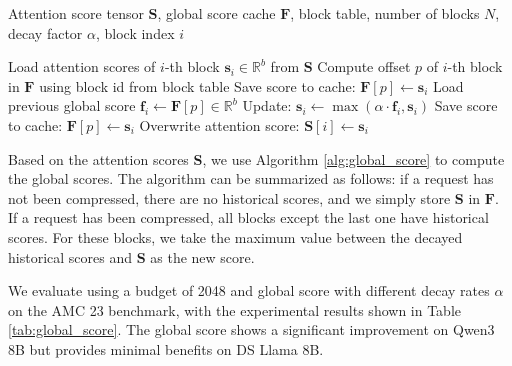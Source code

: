 \documentclass[11pt]{article}
\begin{document}
\begin{algorithm}
\caption{Update Global Score Cache with Attention Scores}
\label{alg:global_score}
\begin{algorithmic}[1]
\Require Attention score tensor $\mathbf S$, global score cache $\mathbf F$, block table, number of blocks $N$, decay factor $\alpha$, block index $i$

\State Load attention scores of $i$-th block  $\mathbf s_i \in \mathbb{R}^b$ from $\mathbf S$
\State Compute offset $p$ of $i$-th block  in $\mathbf F$ using block id from block table
    \State Save score to cache: $ \mathbf F[p] \gets \mathbf s_i$
\Else
        \State Load previous global score $\mathbf f_i \gets \mathbf F[p]\in \mathbb{R}^b$
        \State Update: $\mathbf s_i \gets  \max(\alpha \cdot\mathbf f_i , \mathbf s_i)$
    \EndIf
    \State Save score to cache: $ \mathbf F[p] \gets \mathbf s_i$
    \State Overwrite attention score: $\mathbf S[i] \gets\mathbf s_i$
\EndIf
\end{algorithmic}
\end{algorithm}

Based on the attention scores $\mathbf{S}$, we use Algorithm \ref{alg:global_score} to compute the global scores. The algorithm can be summarized as follows: if a request has not been compressed, there are no historical scores, and we simply store $\mathbf{S}$ in $\mathbf{F}$. If a request has been compressed, all blocks except the last one have historical scores. For these blocks, we take the maximum value between the decayed historical scores and $\mathbf{S}$ as the new score.



\begin{table}[h]
\centering
{}
\caption{ Experimental results with different decay rates $\alpha$.}
\label{tab:global_score}
\end{table}

We evaluate using a budget of 2048 and global score with different decay rates $\alpha$ on the AMC 23 benchmark, with the experimental results shown in Table \ref{tab:global_score}. The global score shows a significant improvement on Qwen3 8B but provides minimal benefits on DS Llama 8B.
\end{document}
